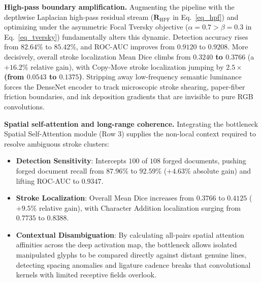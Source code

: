 \documentclass[pdflatex,sn-mathphys-num,iicol]{sn-jnl}
\begin{document}
\noindent
\textbf{High-pass boundary amplification.} Augmenting the pipeline with the depthwise Laplacian high-pass residual stream ($\mathbf{R}_{\text{HPF}}$ in Eq.~\ref{eq_hpf}) and optimizing under the asymmetric Focal Tversky objective ($\alpha = 0.7 > \beta = 0.3$ in Eq.~\ref{eq_tversky}) fundamentally alters this dynamic. Detection accuracy rises from $82.64\%$ to $85.42\%$, and ROC-AUC improves from $0.9120$ to $0.9208$. More decisively, overall stroke localization Mean Dice climbs from \textbf{$0.3240$ to $0.3766$} (a $+16.2\%$ relative gain), with Copy-Move stroke localization jumping by \textbf{$2.5\times$ (from $0.0543$ to $0.1375$)}. Stripping away low-frequency semantic luminance forces the DenseNet encoder to track microscopic stroke shearing, paper-fiber friction boundaries, and ink deposition gradients that are invisible to pure RGB convolutions.

\noindent
\textbf{Spatial self-attention and long-range coherence.} Integrating the bottleneck Spatial Self-Attention module (Row 3) supplies the non-local context required to resolve ambiguous stroke clusters:
\begin{itemize}
    \item \textbf{Detection Sensitivity}: Intercepts $100$ of $108$ forged documents, pushing forged document recall from $87.96\%$ to \textbf{$92.59\%$} ($+4.63\%$ absolute gain) and lifting ROC-AUC to \textbf{$0.9347$}.
    \item \textbf{Stroke Localization}: Overall Mean Dice increases from $0.3766$ to \textbf{$0.4125$} ($+9.5\%$ relative gain), with Character Addition localization surging from $0.7735$ to \textbf{$0.8388$}. 
    \item \textbf{Contextual Disambiguation}: By calculating all-pairs spatial attention affinities across the deep activation map, the bottleneck allows isolated manipulated glyphs to be compared directly against distant genuine lines, detecting spacing anomalies and ligature cadence breaks that convolutional kernels with limited receptive fields overlook.
\end{itemize}
\end{document}
